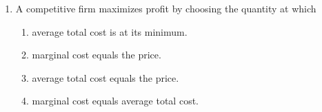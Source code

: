 \documentclass{article}
\begin{document}
\begin{enumerate}
\item A competitive firm maximizes profit by choosing the quantity at which

	\begin{enumerate}
	
	\item average total cost is at its minimum.
	
	\item marginal cost equals the price.
	
	\item average total cost equals the price.
	
	\item marginal cost equals average total cost.
	
	\end{enumerate}

\end{enumerate}
\end{document}
